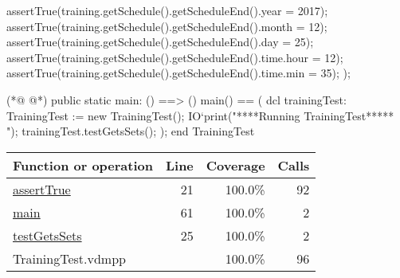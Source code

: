\begin{vdmpp}[breaklines=true]
   assertTrue(training.getSchedule().getScheduleEnd().year = 2017);
   assertTrue(training.getSchedule().getScheduleEnd().month = 12);
   assertTrue(training.getSchedule().getScheduleEnd().day = 25);
   assertTrue(training.getSchedule().getScheduleEnd().time.hour = 12);
   assertTrue(training.getSchedule().getScheduleEnd().time.min = 35);
  );

(*@
\label{main:61}
@*)
 public static main: () ==> ()
   main() == (
    dcl trainingTest: TrainingTest := new TrainingTest();
    IO`print("\n *****Running TrainingTest***** \n");
    trainingTest.testGetsSets();
   );
end TrainingTest
\end{vdmpp}
\bigskip
\begin{longtable}{|l|r|r|r|}
\hline
Function or operation & Line & Coverage & Calls \\
\hline
\hline
\hyperref[assertTrue:21]{assertTrue} & 21&100.0\% & 92 \\
\hline
\hyperref[main:61]{main} & 61&100.0\% & 2 \\
\hline
\hyperref[testGetsSets:25]{testGetsSets} & 25&100.0\% & 2 \\
\hline
\hline
TrainingTest.vdmpp & & 100.0\% & 96 \\
\hline
\end{longtable}

